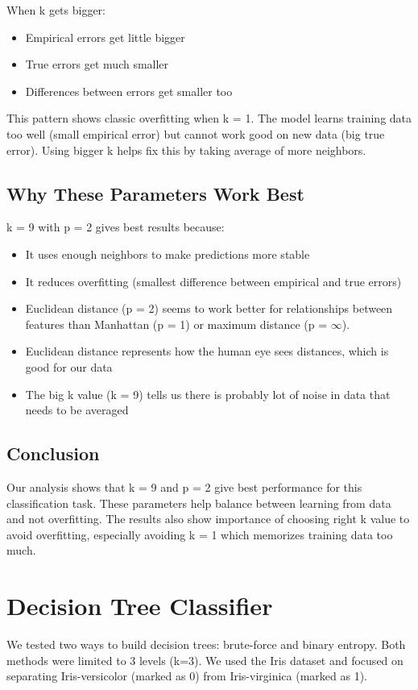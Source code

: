 \documentclass{article}
\begin{document}
When k gets bigger:
\begin{itemize}
    \item Empirical errors get little bigger
    \item True errors get much smaller
    \item Differences between errors get smaller too
\end{itemize}

This pattern shows classic overfitting when k = 1. The model learns training data too well (small empirical error) but cannot work good on new data (big true error). Using bigger k helps fix this by taking average of more neighbors.

\subsection{Why These Parameters Work Best}
k = 9 with p = 2 gives best results because:
\begin{itemize}
    \item It uses enough neighbors to make predictions more stable
    \item It reduces overfitting (smallest difference between empirical and true errors)
    \item Euclidean distance (p = 2) seems to work better for relationships between features than Manhattan (p = 1) or maximum distance (p = $\infty$).
    \item Euclidean distance represents how the human eye sees distances, which is good for our data
    \item The big k value (k = 9) tells us there is probably lot of noise in data that needs to be averaged
\end{itemize}

\subsection{Conclusion}
Our analysis shows that k = 9 and p = 2 give best performance for this classification task. These parameters help balance between learning from data and not overfitting. The results also show importance of choosing right k value to avoid overfitting, especially avoiding k = 1 which memorizes training data too much.

\section{Decision Tree Classifier}

We tested two ways to build decision trees: brute-force and binary entropy. Both methods were limited to 3 levels (k=3). We used the Iris dataset and focused on separating Iris-versicolor (marked as 0) from Iris-virginica (marked as 1).
\end{document}
